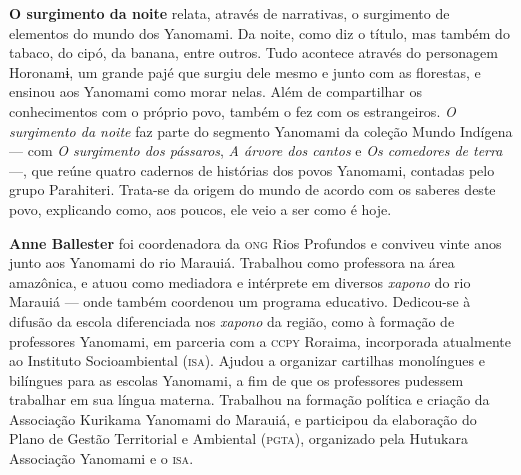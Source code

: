 \textbf{O surgimento da noite} relata, através de narrativas, o surgimento de elementos do mundo dos Yanomami. Da noite, como diz o título, mas também do tabaco, do cipó, da banana, entre outros. Tudo acontece através do personagem Horonamɨ, um grande pajé que surgiu dele mesmo e junto com as florestas, e ensinou aos Yanomami como morar nelas. Além de compartilhar os conhecimentos com o próprio povo, também o fez com os estrangeiros. \textit{O surgimento da noite} faz parte do segmento Yanomami da coleção Mundo Indígena --- com \textit{O surgimento dos pássaros}, \textit{A árvore dos cantos} e \textit{Os comedores de terra} ---, que reúne quatro cadernos de histórias dos povos Yanomami, contadas pelo grupo Parahiteri. Trata-se da origem do mundo de acordo com os saberes deste povo, explicando como, aos poucos, ele veio a ser como é hoje.

\textbf{Anne Ballester} foi coordenadora da \textsc{ong} Rios Profundos e conviveu vinte anos junto aos Yanomami do rio Marauiá. Trabalhou como professora na área amazônica, e atuou como mediadora e intérprete em diversos \textit{xapono} do rio Marauiá --- onde também coordenou um programa educativo. Dedicou-se à difusão da escola diferenciada nos \textit{xapono} da região, como à formação de professores Yanomami, em parceria com a \textsc{ccpy} Roraima, incorporada atualmente ao Instituto Socioambiental (\textsc{isa}). Ajudou a organizar cartilhas monolíngues e bilíngues para as escolas Yanomami, a fim de que os professores pudessem trabalhar em sua língua materna. Trabalhou na formação política e criação da Associação Kurikama Yanomami do Marauiá, e participou da elaboração do Plano de Gestão Territorial e Ambiental (\textsc{pgta}), organizado pela Hutukara Associação Yanomami e o \textsc{isa}.





